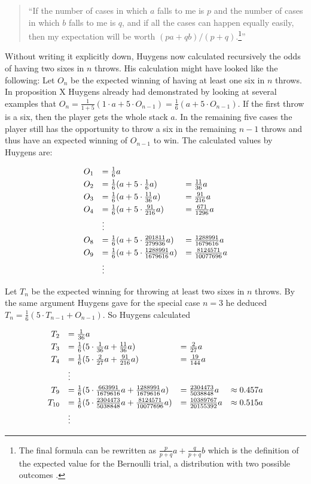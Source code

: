 \begin{quote}
  ``If the number of cases in which $a$ falls to me is $p$ and the number of cases in which $b$ falls to me is $q$, and if all the cases can happen equally easily, then my expectation will be worth $(pa+qb)/(p+q)$.\footnote{The final formula can be rewritten as $\tfrac{p}{p+q} a+\tfrac q{p+q} b$ which is the definition of the expected value for the Bernoulli trial, a distribution with two possible outcomes \cite{wiki:bernoulli_distribution}.}''
\end{quote}

Without writing it explicitly down, Huygens now calculated recursively the odds of having two sixes in $n$ throws. His calculation might have looked like the following: Let $O_n$ be the expected winning of having at least one six in $n$ throws. In proposition X Huygens already had demonstrated by looking at several examples that $O_n = \tfrac 1{1+5} \left( 1 \cdot a + 5 \cdot O_{n-1} \right)=\tfrac 16 \left( a + 5 \cdot O_{n-1} \right)$. If the first throw is a six, then the player gets the whole stack $a$. In the remaining five cases the player still has the opportunity to throw a six in the remaining $n-1$ throws and thus have an expected winning of $O_{n-1}$ to win. The calculated values by Huygens are:

\begin{align}
  \begin{array}{rll}
    O_1 & = \frac 16 a \nl
    O_2 & = \frac 16 ( a + 5 \cdot \frac 16 a) & = \frac{11}{36} a \nl
    O_3 & = \frac 16 ( a + 5 \cdot \frac{11}{36} a) & = \frac{91}{216} a \nl
    O_4 & = \frac 16 ( a + 5 \cdot \frac{91}{216} a) & = \frac{671}{1296} a \nl
    & \vdots \nl
    O_8 & = \frac 16 ( a + 5 \cdot \frac{201811}{279936} a) & = \frac{1288991}{1679616} a \nl
    O_9 & = \frac 16 ( a + 5 \cdot \frac{1288991}{1679616} a) & = \frac{8124571}{10077696} a \nl
    & \vdots
  \end{array}
\end{align}

Let $T_n$ be the expected winning for throwing at least two sixes in $n$ throws. By the same argument Huygens gave for the special case $n=3$ he deduced $T_n = \tfrac{1}{6} ( 5 \cdot T_{n-1}  + O_{n-1})$. So Huygens calculated

\begin{align}
  \begin{array}{rlll}
    T_2 & = \frac 1{36} a \nl
    T_3 & = \frac 16 (5 \cdot \frac 1{36} a + \frac{11}{36} a) &= \frac 2{27} a \nl
    T_4 & = \frac 16 (5 \cdot \frac 2{27} a + \frac{91}{216} a) &= \frac {19}{144} a \nl
    & \vdots \nl
    T_9 & = \frac 16 (5 \cdot \frac {663991}{1679616} a + \frac{1288991}{1679616} a) &= \frac {2304473}{5038848} a & \approx 0.457 a \nl
    T_{10} & = \frac 16 (5 \cdot \frac{2304473}{5038848} a + \frac{8124571}{10077696} a) &= \frac{10389767}{20155392} a & \approx 0.515 a \nl
    & \vdots 
  \end{array}
\end{align}

